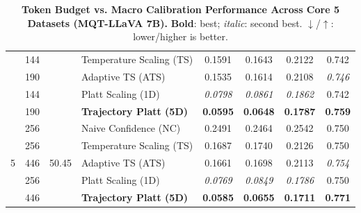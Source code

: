 \begin{table}[t]
\begin{tabular}{ccclcccc}
 & 144 &  & Temperature Scaling (TS) & 0.1591 & 0.1643 & 0.2122 & 0.742 \\
 & 190 &  & Adaptive TS (ATS) & 0.1535 & 0.1614 & 0.2108 & \textit{0.746} \\
 & 144 &  & Platt Scaling (1D) & \textit{0.0798} & \textit{0.0861} & \textit{0.1862} & 0.742 \\
 & 190 &  & \textbf{Trajectory Platt (5D)} & \textbf{0.0595} & \textbf{0.0648} & \textbf{0.1787} & \textbf{0.759} \\
\midrule
\multirow{5}{*}{5} & 256 & \multirow{5}{*}{50.45} & Naive Confidence (NC) & 0.2491 & 0.2464 & 0.2542 & 0.750 \\
 & 256 &  & Temperature Scaling (TS) & 0.1687 & 0.1740 & 0.2126 & 0.750 \\
 & 446 &  & Adaptive TS (ATS) & 0.1661 & 0.1698 & 0.2113 & \textit{0.754} \\
 & 256 &  & Platt Scaling (1D) & \textit{0.0769} & \textit{0.0849} & \textit{0.1786} & 0.750 \\
 & 446 &  & \textbf{Trajectory Platt (5D)} & \textbf{0.0585} & \textbf{0.0655} & \textbf{0.1711} & \textbf{0.771} \\
\bottomrule
\end{tabular}
\caption{\textbf{Token Budget vs. Macro Calibration Performance Across Core 5 Datasets (MQT-LLaVA 7B).} \textbf{Bold}: best; \textit{italic}: second best. $\downarrow$/$\uparrow$: lower/higher is better.}
\label{tab:token_budget_macro_core5_mqt}
\end{table}
